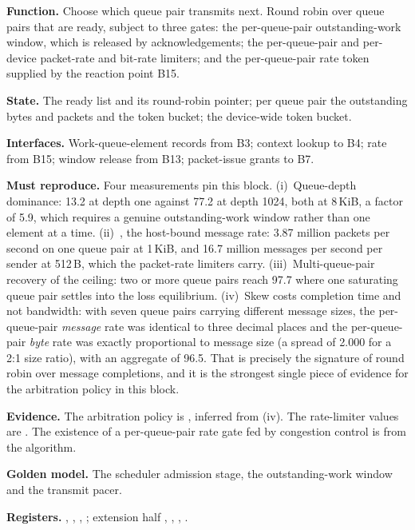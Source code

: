 \textbf{Function.} Choose which queue pair transmits next. Round robin over
queue pairs that are ready, subject to three gates: the per-queue-pair
outstanding-work window, which is released by acknowledgements; the
per-queue-pair and per-device packet-rate and bit-rate limiters; and the
per-queue-pair rate token supplied by the reaction point B15.

\textbf{State.} The ready list and its round-robin pointer; per queue pair the
outstanding bytes and packets and the token bucket; the device-wide token
bucket.

\textbf{Interfaces.} Work-queue-element records from B3; context lookup to B4;
rate from B15; window release from B13; packet-issue grants to B7.

\textbf{Must reproduce.} Four measurements pin this block.
(i)~Queue-depth dominance: 13.2\Gbps{} at depth one against 77.2\Gbps{} at
depth 1024, both at 8\,KiB, a factor of 5.9, which requires a genuine
outstanding-work window rather than one element at a time.
(ii)~, the host-bound message rate: 3.87 million packets per second on
one queue pair at 1\,KiB, and 16.7 million messages per second per sender at
512\,B, which the packet-rate limiters carry.
(iii)~Multi-queue-pair recovery of the ceiling: two or more queue pairs reach
97.7\Gbps{} where one saturating queue pair settles into the loss equilibrium.
(iv)~Skew costs completion time and not bandwidth: with seven queue pairs
carrying different message sizes, the per-queue-pair \emph{message} rate was
identical to three decimal places and the per-queue-pair \emph{byte} rate was
exactly proportional to message size (a spread of 2.000 for a 2:1 size ratio),
with an aggregate of 96.5\Gbps{}. That is precisely the signature of round
robin over message completions, and it is the strongest single piece of
evidence for the arbitration policy in this block.

\textbf{Evidence.} The arbitration policy is \evcal{}, inferred from (iv). The
rate-limiter values are \evcal{}. The existence of a per-queue-pair rate gate
fed by congestion control is \evdoc{} from the algorithm.

\textbf{Golden model.} The scheduler admission stage, the outstanding-work
window and the transmit pacer.

{\raggedright
\textbf{Registers.} , ,
, ; extension half
, , ,
.\par}

